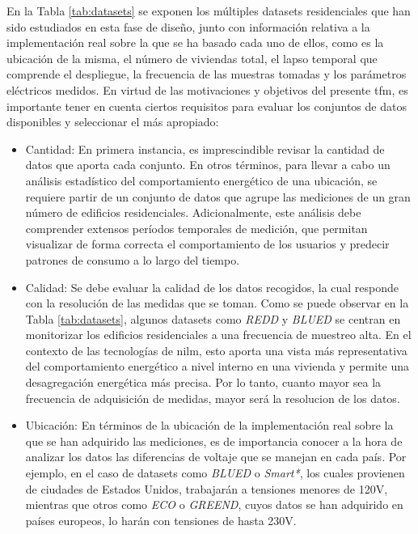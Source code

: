 \vspace{3mm}

En la Tabla \ref{tab:datasets} se exponen los múltiples datasets residenciales que han sido estudiados en esta fase de diseño, junto con información relativa a la implementación real sobre la que se ha basado cada uno de ellos, como es la ubicación de la misma, el número de viviendas total, el lapso temporal que comprende el despliegue, la frecuencia de las muestras tomadas y los parámetros eléctricos medidos. En virtud de las motivaciones y objetivos del presente \gls{tfm}, es importante tener en cuenta ciertos requisitos para evaluar los conjuntos de datos disponibles y seleccionar el más apropiado:

\vspace{1mm}

\begin{itemize}
    \item Cantidad: En primera instancia, es imprescindible revisar la cantidad de datos que aporta cada conjunto. En otros términos, para llevar a cabo un análisis estadístico del comportamiento energético de una ubicación, se requiere partir de un conjunto de datos que agrupe las mediciones de un gran número de edificios residenciales. Adicionalmente, este análisis debe comprender extensos períodos temporales de medición, que permitan visualizar de forma correcta el comportamiento de los usuarios y predecir patrones de consumo a lo largo del tiempo.
    \item Calidad: Se debe evaluar la calidad de los datos recogidos, la cual responde con la resolución de las medidas que se toman. Como se puede observar en la Tabla \ref{tab:datasets}, algunos datasets como \textit{REDD} y \textit{BLUED} se centran en monitorizar los edificios residenciales a una frecuencia de muestreo alta. En el contexto de las tecnologías de \gls{nilm}, esto aporta una vista más representativa del comportamiento energético a nivel interno en una vivienda y permite una desagregación energética más precisa. Por lo tanto, cuanto mayor sea la frecuencia de adquisición de medidas, mayor será la resolucion de los datos. 
    \item Ubicación: En términos de la ubicación de la implementación real sobre la que se han adquirido las mediciones, es de importancia conocer a la hora de analizar los datos las diferencias de voltaje que se manejan en cada país. Por ejemplo, en el caso de datasets como \textit{BLUED} o \textit{Smart*}, los cuales provienen de ciudades de Estados Unidos, trabajarán a tensiones menores de 120V, mientras que otros como \textit{ECO} o \textit{GREEND}, cuyos datos se han adquirido en países europeos, lo harán con tensiones de hasta 230V. \cite{greend} \cite{powercons}

\end{itemize}
